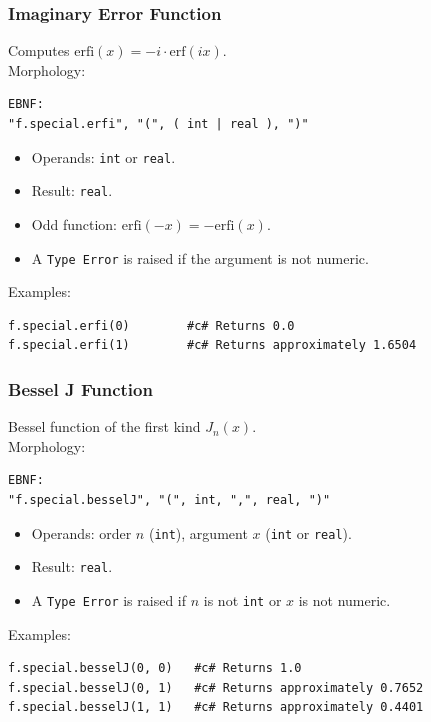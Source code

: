 \subsubsection{Imaginary Error Function}
Computes $\text{erfi}(x) = -i \cdot \text{erf}(ix)$. \\
Morphology:
\begin{verbatim}
EBNF:
"f.special.erfi", "(", ( int | real ), ")"
\end{verbatim}
\begin{itemize}
\item Operands: \texttt{int} or \texttt{real}.
\item Result: \texttt{real}.
\item Odd function: $\text{erfi}(-x) = -\text{erfi}(x)$.
\item A \texttt{Type Error} is raised if the argument is not numeric.
\end{itemize}
Examples:
\begin{verbatim}
f.special.erfi(0)        #c# Returns 0.0
f.special.erfi(1)        #c# Returns approximately 1.6504
\end{verbatim}

\subsubsection{Bessel J Function}
Bessel function of the first kind $J_n(x)$. \\
Morphology:
\begin{verbatim}
EBNF:
"f.special.besselJ", "(", int, ",", real, ")"
\end{verbatim}
\begin{itemize}
\item Operands: order $n$ (\texttt{int}), argument $x$ (\texttt{int} or \texttt{real}).
\item Result: \texttt{real}.
\item A \texttt{Type Error} is raised if $n$ is not \texttt{int} or $x$ is not numeric.
\end{itemize}
Examples:
\begin{verbatim}
f.special.besselJ(0, 0)   #c# Returns 1.0
f.special.besselJ(0, 1)   #c# Returns approximately 0.7652
f.special.besselJ(1, 1)   #c# Returns approximately 0.4401
\end{verbatim}

